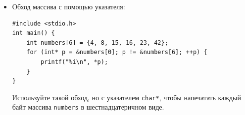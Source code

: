 \documentclass{article}
\begin{document}
\begin{itemize}
Чему равны следующие выражения:
\begin{multicols}{3}
\begin{enumerate}
\item \begin{verbatim} numbers[5] \end{verbatim}
\item \begin{verbatim} *p \end{verbatim}
\item \begin{verbatim} *(p+1) \end{verbatim}
\item \begin{verbatim} *(p-2) \end{verbatim}
\item \begin{verbatim} p[0] \end{verbatim}
\item \begin{verbatim} p[1] \end{verbatim}
\item \begin{verbatim} p[-2] \end{verbatim}
\item \begin{verbatim} *numbers \end{verbatim}
\item \begin{verbatim} *(numbers+5) \end{verbatim}
\item \begin{verbatim} p - numbers \end{verbatim}
\item \begin{verbatim} (short*)p - (short*)numbers \end{verbatim}
\item \begin{verbatim} (char*)p - (char*)numbers \end{verbatim}
\end{enumerate}
\end{multicols}
Подсказка: имя массива во многих случаях ведёт себя как указатель на первый элемент массива. \\

\item Обход массива с помощью указателя:
\begin{lstlisting}
#include <stdio.h>
int main() {
    int numbers[6] = {4, 8, 15, 16, 23, 42};
    for (int* p = &numbers[0]; p != &numbers[6]; ++p) {
        printf("%i\n", *p);
    }
}
\end{lstlisting}
Используйте такой обход, но с указателем \texttt{char*}, чтобы напечатать каждый байт массива \texttt{numbers} в шестнадцатеричном виде.
\end{itemize}
\newpage
\end{document}
